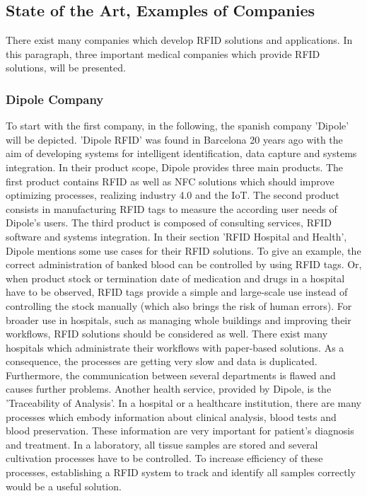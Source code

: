 \subsection{State of the Art, Examples of Companies}

There exist many companies which develop \ac{RFID} solutions and applications. In this paragraph, three important medical companies which provide RFID solutions, will be presented.

\subsubsection{Dipole Company}

To start with the first company, in the following, the spanish company 'Dipole' \cite{dipole} will be depicted. 'Dipole RFID' was found in Barcelona 20 years ago with the aim of developing systems for intelligent identification, data capture and systems integration. In their product scope, Dipole provides three main products. The first product contains RFID as well as \ac{NFC} solutions which should improve optimizing processes, realizing industry 4.0 and the \ac{IoT}. The second product consists in manufacturing RFID tags to measure the according user needs of Dipole's users. The third product is composed of consulting services, RFID software and systems integration.
In their section 'RFID Hospital and Health', Dipole mentions some use cases for their RFID solutions. To give an example, the correct administration of banked blood can be controlled by using RFID tags. Or, when product stock or termination date of medication and drugs in a hospital have to be observed, RFID tags provide a simple and large-scale use instead of controlling the stock manually (which also brings the risk of human errors). For broader use in hospitals, such as managing whole buildings and improving their workflows, RFID solutions should be considered as well. There exist many hospitals which administrate their workflows with paper-based solutions. As a consequence, the processes are getting very slow and data is duplicated. Furthermore, the communication between several departments is flawed and causes further problems.
Another health service, provided by Dipole, is the 'Traceability of Analysis'. In a hospital or a healthcare institution, there are many processes which embody information about clinical analysis, blood tests and blood preservation. These information are very important for patient's diagnosis and treatment. In a laboratory, all tissue samples are stored and several cultivation processes have to be controlled. To increase efficiency of these processes, establishing a RFID system to track and identify all samples correctly would be a useful solution.
